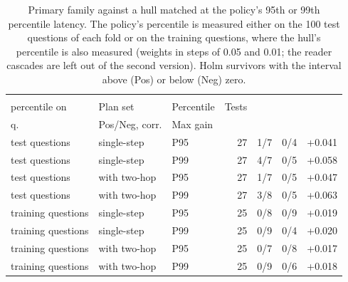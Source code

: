 \begin{table}[t]
\centering\small
\setlength{\tabcolsep}{4pt}
\caption{Primary family against a hull matched at the policy's 95th or 99th percentile latency. The policy's percentile is measured either on the 100 test questions of each fold or on the training questions, where the hull's percentile is also measured (weights in steps of 0.05 and 0.01; the reader cascades are left out of the second version). Holm survivors with the interval above (Pos) or below (Neg) zero.}
\label{tab:tail2}
\begin{tabular*}{\linewidth}{@{\extracolsep{\fill}}lllrrrr}
\toprule
\begin{tabular}[b]{@{}l@{}}Policy \\ percentile on\end{tabular} & Plan set & Percentile & Tests & \begin{tabular}[b]{@{}r@{}}Pos/Neg, per \\ q.\end{tabular} & Pos/Neg, corr. & Max gain \\
\midrule
test questions & single-step & P95 & 27 & 1/7 & 0/4 & +0.041 \\
test questions & single-step & P99 & 27 & 4/7 & 0/5 & +0.058 \\
test questions & with two-hop & P95 & 27 & 1/7 & 0/5 & +0.047 \\
test questions & with two-hop & P99 & 27 & 3/8 & 0/5 & +0.063 \\
training questions & single-step & P95 & 25 & 0/8 & 0/9 & +0.019 \\
training questions & single-step & P99 & 25 & 0/9 & 0/4 & +0.020 \\
training questions & with two-hop & P95 & 25 & 0/7 & 0/8 & +0.017 \\
training questions & with two-hop & P99 & 25 & 0/9 & 0/6 & +0.018 \\
\bottomrule
\end{tabular*}
\end{table}
